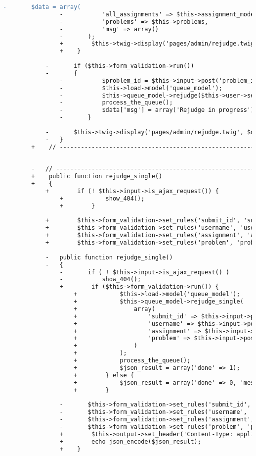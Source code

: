 \begin{lstlisting}[language=diff, caption=Perubahan pada kode Rejudge.php]
				-		$data = array(
				-			'all_assignments' => $this->assignment_model->all_assignments(),
				-			'problems' => $this->problems,
				-			'msg' => array()
				-		);
				+        $this->twig->display('pages/admin/rejudge.twig', $data);
				+    }
			
			-		if ($this->form_validation->run())
			-		{
				-			$problem_id = $this->input->post('problem_id');
				-			$this->load->model('queue_model');
				-			$this->queue_model->rejudge($this->user->selected_assignment['id'], $problem_id);
				-			process_the_queue();
				-			$data['msg'] = array('Rejudge in progress');
				-		}
			
			-		$this->twig->display('pages/admin/rejudge.twig', $data);
			-	}
		+    // ------------------------------------------------------------------------
		
		
		-	// ------------------------------------------------------------------------
		+    public function rejudge_single()
		+    {
			+        if (! $this->input->is_ajax_request()) {
				+            show_404();
				+        }
			
			+        $this->form_validation->set_rules('submit_id', 'submit id', 'required|integer');
			+        $this->form_validation->set_rules('username', 'username', 'required|alpha_numeric');
			+        $this->form_validation->set_rules('assignment', 'assignment', 'required|integer');
			+        $this->form_validation->set_rules('problem', 'problem', 'required|integer');
			
			-	public function rejudge_single()
			-	{
				-		if ( ! $this->input->is_ajax_request() )
				-			show_404();
				+        if ($this->form_validation->run()) {
					+            $this->load->model('queue_model');
					+            $this->queue_model->rejudge_single(
					+                array(
					+                    'submit_id' => $this->input->post('submit_id'),
					+                    'username' => $this->input->post('username'),
					+                    'assignment' => $this->input->post('assignment'),
					+                    'problem' => $this->input->post('problem'),
					+                )
					+            );
					+            process_the_queue();
					+            $json_result = array('done' => 1);
					+        } else {
					+            $json_result = array('done' => 0, 'message' => 'Input Error');
					+        }
				
				-		$this->form_validation->set_rules('submit_id', 'submit id', 'required|integer');
				-		$this->form_validation->set_rules('username', 'username', 'required|alpha_numeric');
				-		$this->form_validation->set_rules('assignment', 'assignment', 'required|integer');
				-		$this->form_validation->set_rules('problem', 'problem', 'required|integer');
				+        $this->output->set_header('Content-Type: application/json; charset=utf-8');
				+        echo json_encode($json_result);
				+    }
			

\end{lstlisting}
